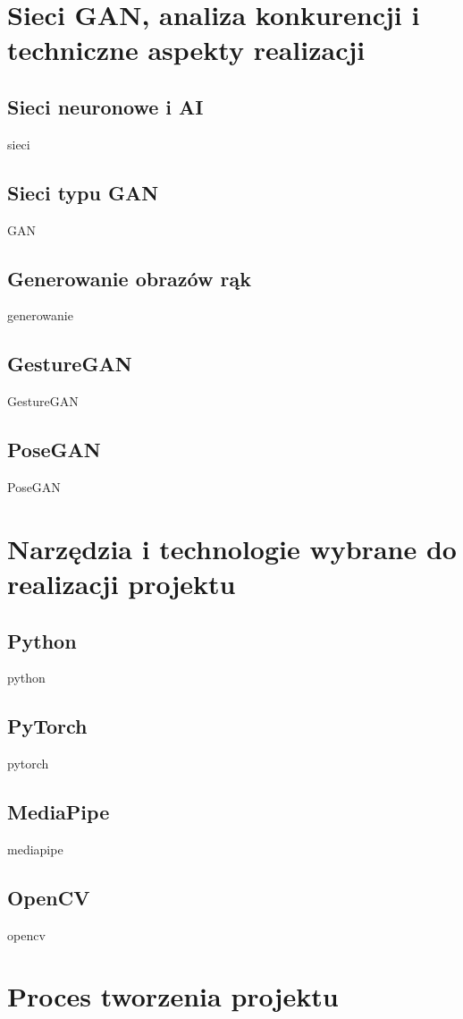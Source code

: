 \documentclass[12pt]{article}
\begin{document}
\begin{sloppypar}
\section{Sieci GAN, analiza konkurencji i techniczne aspekty realizacji}
{
  \subsection{Sieci neuronowe i AI}
  {
    sieci
  }
  \subsection{Sieci typu GAN}
  {
    GAN
  }
  \subsection{Generowanie obrazów rąk}
  {
    generowanie
  }
  \subsection{GestureGAN}
  {
    GestureGAN
  }
  \subsection{PoseGAN}
  {
    PoseGAN
  }
}

\section{Narzędzia i technologie wybrane do realizacji projektu}
{
  \subsection{Python}
  {
    python
  }
  \subsection{PyTorch}
  {
    pytorch
  }
  \subsection{MediaPipe}
  {
    mediapipe
  
  }
  \subsection{OpenCV}
  {
    opencv
  }
}

\section{Proces tworzenia projektu}
{
}
\end{sloppypar}
\end{document}
